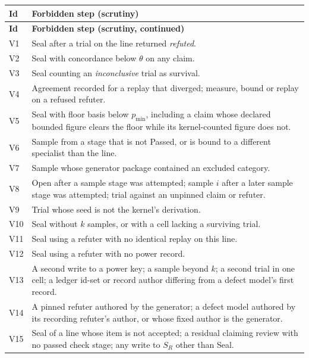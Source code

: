 \documentclass[11pt,a4paper]{article}
\theoremstyle{plain}
\theoremstyle{definition}
\theoremstyle{remark}
\newcommand{\SR}{\ensuremath{S_R}}
\begin{document}
\begin{longtable}{@{}p{}p{}@{}}
\toprule
\textbf{Id} & \textbf{Forbidden step (scrutiny)} \\
\midrule
\endfirsthead
\toprule
\textbf{Id} & \textbf{Forbidden step (scrutiny, continued)} \\
\midrule
\endhead
V1 & Seal after a trial on the line returned \emph{refuted}. \\
V2 & Seal with concordance below $\theta$ on any claim. \\
V3 & Seal counting an \emph{inconclusive} trial as survival. \\
V4 & Agreement recorded for a replay that diverged; measure, bound or replay on a refused refuter. \\
V5 & Seal with floor basis below $p_{\min}$, including a claim whose declared bounded figure clears the floor while its kernel-counted figure does not. \\
V6 & Sample from a stage that is not Passed, or is bound to a different specialist than the line. \\
V7 & Sample whose generator package contained an excluded category. \\
V8 & Open after a sample stage was attempted; sample $i$ after a later sample stage was attempted; trial against an unpinned claim or refuter. \\
V9 & Trial whose seed is not the kernel's derivation. \\
V10 & Seal without $k$ samples, or with a cell lacking a surviving trial. \\
V11 & Seal using a refuter with no identical replay on this line. \\
V12 & Seal using a refuter with no power record. \\
V13 & A second write to a power key; a sample beyond $k$; a second trial in one cell; a ledger id-set or record author differing from a defect model's first record. \\
V14 & A pinned refuter authored by the generator; a defect model authored by its recording refuter's author, or whose fixed author is the generator. \\
V15 & Seal of a line whose item is not accepted; a residual claiming review with no passed check stage; any write to $\SR$ other than Seal. \\
\bottomrule
\end{longtable}
\end{document}

